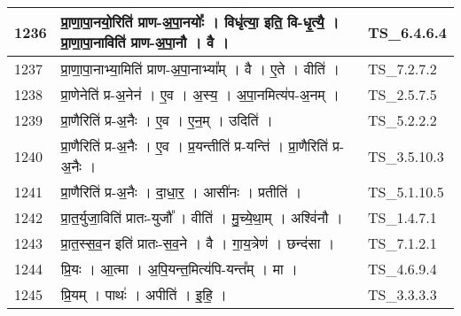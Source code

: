 \documentclass[17pt]{extarticle}
\begin{document}
\begin{longtable}{||p{0.4in}||p{4.9in}||p{0.9in}||}
    \hline
        
    1236 & प्रा॒णा॒पा॒नयो॒रिति॑ प्राण{-}अ॒पा॒नयोः᳚   ।   विधृ॑त्या॒ इति॒ वि{-}धृ॒त्यै॒   ।   प्रा॒णा॒पा॒नाविति॑ प्राण{-}अ॒पा॒नौ   ।   वै   ।    & TS\_6.4.6.4       \\
    
    \hline
        
    1237 & प्रा॒णा॒पा॒नाभ्या॒मिति॑ प्राण{-}अ॒पा॒नाभ्या᳚म्   ।   वै   ।   ए॒ते   ।   वीति॑   ।    & TS\_7.2.7.2       \\
    
    \hline
        
    1238 & प्रा॒णेनेति॑ प्र{-}अ॒नेन॑   ।   ए॒व   ।   अ॒स्य॒   ।   अ॒पा॒नमित्य॑प{-}अ॒नम्   ।    & TS\_2.5.7.5       \\
    
    \hline
        
    1239 & प्रा॒णैरिति॑ प्र{-}अ॒नैः   ।   ए॒व   ।   ए॒न॒म्   ।   उदिति॑   ।    & TS\_5.2.2.2       \\
    
    \hline
        
    1240 & प्रा॒णैरिति॑ प्र{-}अ॒नैः   ।   ए॒व   ।   प्र॒यन्तीति॑ प्र{-}यन्ति॑   ।   प्रा॒णैरिति॑ प्र{-}अ॒नैः   ।    & TS\_3.5.10.3       \\
    
    \hline
        
    1241 & प्रा॒णैरिति॑ प्र{-}अ॒नैः   ।   दा॒धा॒र॒   ।   आसी॑नः   ।   प्रतीति॑   ।    & TS\_5.1.10.5       \\
    
    \hline
        
    1242 & प्रा॒त॒र्युजा॒विति॑ प्रातः{-}युजौ᳚   ।   वीति॑   ।   मु॒च्ये॒था॒म्   ।   अश्वि॑नौ   ।    & TS\_1.4.7.1       \\
    
    \hline
        
    1243 & प्रा॒त॒स्स॒व॒न इति॑ प्रातः{-}स॒व॒ने   ।   वै   ।   गा॒य॒त्रेण॑   ।   छन्द॑सा   ।    & TS\_7.1.2.1       \\
    
    \hline
        
    1244 & प्रि॒यः   ।   आ॒त्मा   ।   अ॒पि॒यन्त॒मित्य॑पि{-}यन्त᳚म्   ।   मा   ।    & TS\_4.6.9.4       \\
    
    \hline
        
    1245 & प्रि॒यम्   ।   पाथः॑   ।   अपीति॑   ।   इ॒हि॒   ।    & TS\_3.3.3.3       \\
    

\end{longtable}
\end{document}
